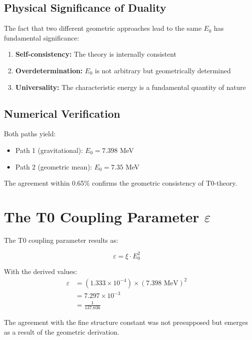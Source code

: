 \documentclass[12pt,a4paper]{report}
\begin{document}
	\subsection{Physical Significance of Duality}
	
	The fact that two different geometric approaches lead to the same $E_0$ has fundamental significance:
	
	\begin{enumerate}
		\item \textbf{Self-consistency:} The theory is internally consistent
		\item \textbf{Overdetermination:} $E_0$ is not arbitrary but geometrically determined
		\item \textbf{Universality:} The characteristic energy is a fundamental quantity of nature
	\end{enumerate}
	
	\subsection{Numerical Verification}
	
	Both paths yield:
	\begin{itemize}
		\item Path 1 (gravitational): $E_0 = 7.398$ MeV
		\item Path 2 (geometric mean): $E_0 = 7.35$ MeV
	\end{itemize}
	
	The agreement within 0.65\% confirms the geometric consistency of T0-theory.
	
	\section{The T0 Coupling Parameter $\varepsilon$}
	
	The T0 coupling parameter results as:
	
	\begin{equation}
		\varepsilon = \xi \cdot E_0^2
	\end{equation}
	
	With the derived values:
	\begin{align}
		\varepsilon &= (1.333 \times 10^{-4}) \times (7.398 \text{ MeV})^2\\
		&= 7.297 \times 10^{-3}\\
		&= \frac{1}{137.036}
	\end{align}
	
	The agreement with the fine structure constant was not presupposed but emerges as a result of the geometric derivation.
\end{document}
